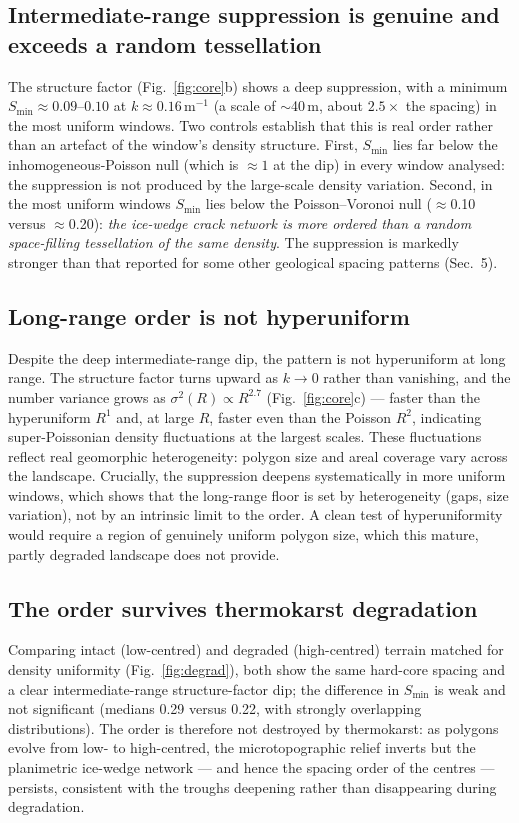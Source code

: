 \documentclass[11pt]{article}
\begin{document}
\subsection{Intermediate-range suppression is genuine and exceeds a random tessellation}
The structure factor (Fig.~\ref{fig:core}b) shows a deep suppression, with a minimum
$S_{\min}\!\approx\!0.09$--$0.10$ at $k\!\approx\!0.16\,\mathrm{m}^{-1}$ (a scale of
$\sim$40\,m, about $2.5\times$ the spacing) in the most uniform windows. Two controls
establish that this is real order rather than an artefact of the window's density structure.
First, $S_{\min}$ lies far below the inhomogeneous-Poisson null (which is $\approx\!1$ at the
dip) in every window analysed: the suppression is not produced by the large-scale density
variation. Second, in the most uniform windows $S_{\min}$ lies below the Poisson--Voronoi
null ($\approx$0.10 versus $\approx$0.20): \emph{the ice-wedge crack network is more ordered
than a random space-filling tessellation of the same density}. The suppression is markedly
stronger than that reported for some other geological spacing patterns (Sec.~5).

\subsection{Long-range order is not hyperuniform}
Despite the deep intermediate-range dip, the pattern is not hyperuniform at long range. The
structure factor turns upward as $k\!\to\!0$ rather than vanishing, and the number variance
grows as $\sigma^2(R)\!\propto\!R^{2.7}$ (Fig.~\ref{fig:core}c) --- faster than the
hyperuniform $R^{1}$ and, at large $R$, faster even than the Poisson $R^{2}$, indicating
super-Poissonian density fluctuations at the largest scales. These fluctuations reflect real
geomorphic heterogeneity: polygon size and areal coverage vary across the landscape. Crucially,
the suppression deepens systematically in more uniform windows, which shows that the long-range
floor is set by heterogeneity (gaps, size variation), not by an intrinsic limit to the order.
A clean test of hyperuniformity would require a region of genuinely uniform polygon size, which
this mature, partly degraded landscape does not provide.

\subsection{The order survives thermokarst degradation}
Comparing intact (low-centred) and degraded (high-centred) terrain matched for density
uniformity (Fig.~\ref{fig:degrad}), both show the same hard-core spacing and a clear
intermediate-range structure-factor dip; the difference in $S_{\min}$ is weak and not
significant (medians 0.29 versus 0.22, with strongly overlapping distributions). The order is
therefore not destroyed by thermokarst: as polygons evolve from low- to high-centred, the
microtopographic relief inverts but the planimetric ice-wedge network --- and hence the
spacing order of the centres --- persists, consistent with the troughs deepening rather than
disappearing during degradation.
\end{document}
